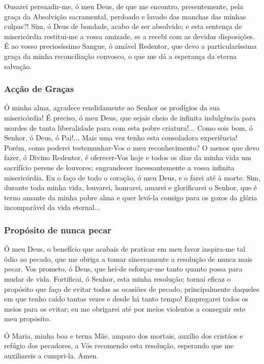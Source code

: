 Ousarei persuadir-me, ó meu Deus, de que me encontro, presentemente, pela graça da Absolvição sacramental, perdoado e lavado das manchas das minhas culpas?! Sim, ó Deus de bondade, acabo de ser absolvido; e esta sentença de misericórdia restitui-me a vossa amizade, se a recebi com as devidas disposições. É ao vosso preciosíssimo Sangue, ó amável Redentor, que devo a particularíssima graça da minha reconciliação convosco, o que me dá a esperança da eterna salvação.

\subsubsection{Acção de Graças}

Ó minha alma, agradece rendidamente ao Senhor os prodígios da sua misericórdia! É preciso, ó meu Deus, que sejais cheio de infinita indulgência para usardes de tanta liberalidade para com esta pobre criatura!... Como sois bom, ó Senhor, ó Deus, ó Pai!... Mais uma vez tenho esta consoladora experiência! Porém, como poderei testemunhar-Vos o meu reconhecimento? O menos que devo fazer, ó Divino Redentor, é oferecer-Vos hoje e todos os dias da minha vida um sacrifício perene de louvores; engrandecer incessantemente a vossa infinita misericórdia. Eu o faço de todo o coração, ó meu Deus, e o farei até à morte. Sim, durante toda minha vida, louvarei, honrarei, amarei e glorificarei o Senhor, que é terno amante da minha pobre alma e quer levá-la consigo para os gozos da glória incomparável da vida eternal...

\subsubsection{Propósito de nunca pecar}

Ó meu Deus, o benefício que acabais de praticar em meu favor inspira-me tal ódio ao pecado, que me obriga a tomar sinceramente a resolução de nunca mais pecar. Vos prometo, ó Deus, que hei-de esforçar-me tanto quanto possa para mudar de vida. Fortificai, ó Senhor, esta minha resolução; tornai eficaz o propósito que faço de evitar todas as ocasiões de pecado, principalmente daqueles em que tenho caído tantas vezes e desde há tanto tempo! Empregarei todos os meios para os evitar; eu me obrigarei até por meios violentos a conseguir este meu propósito.

Ó Maria, minha boa e terna Mãe, amparo dos mortais, auxílio dos cristãos e refúgio dos pecadores, a Vós recomendo esta resolução, esperando que me auxiliareis a cumpri-la. Amen.
